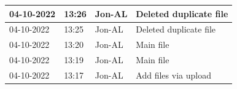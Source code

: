 \documentclass[11pt]{article}
\begin{document}
\begin{center}
\begin{longtable}{|p{2cm}|l|p{2cm}|p{10.5cm}|}
            04-10-2022                                 & 13:26                              & Jon-AL                                  & Deleted duplicate file                                                                                                                                                                                                                                                                                       \\ \hline
            04-10-2022                                 & 13:25                              & Jon-AL                                  & Deleted duplicate file                                                                                                                                                                                                                                                                                       \\ \hline
            04-10-2022                                 & 13:20                              & Jon-AL                                  & Main file                                                                                                                                                                                                                                                                                                    \\ \hline
            04-10-2022                                 & 13:19                              & Jon-AL                                  & Main file                                                                                                                                                                                                                                                                                                    \\ \hline
            04-10-2022                                 & 13:17                              & Jon-AL                                  & Add files via upload                                                                                                                                                                                                                                                                                         \\


        \end{longtable}
    \end{center}
\end{document}
